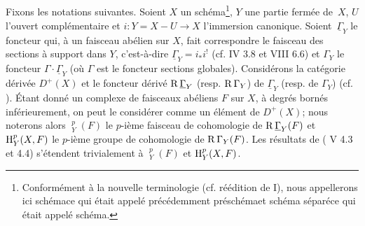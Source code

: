 \subsection{}\label{XIV.1.0}
Fixons les notations suivantes. Soient $X$ un sch\'ema\footnote{Conform\'ement \`a la nouvelle terminologie (cf. r\'e\'edition de \EGA I), nous appellerons ici \og sch\'ema\fg ce qui \'etait appel\'e pr\'ec\'edemment \og pr\'esch\'ema\fg et \og sch\'ema s\'epar\'e\fg ce qui \'etait appel\'e \og sch\'ema\fg.}, $Y$ une partie ferm\'ee de~$X$, $U$ l'ouvert compl\'ementaire et $i:Y=X-U\to X$ l'immersion canonique. Soient~$\underline{\Gamma}_Y$ le foncteur qui, \`a un faisceau ab\'elien sur $X$, fait correspondre le \og faisceau des sections \`a support dans $Y$\fg, c'est-\`a-dire $\underline{\Gamma}_Y=i_*i^!$ (cf.  IV 3.8 et VIII 6.6) et $\Gamma_Y$ le foncteur $\Gamma\cdot \underline{\Gamma}_Y$ (o\`u $\Gamma$ est le foncteur \og sections globales{\fg}). Consid\'erons la cat\'egorie d\'eriv\'ee $D^+(X)$ et le foncteur d\'eriv\'e $\operatorname{R}\underline{\Gamma}_Y$ (resp. $\operatorname{R}\Gamma_Y$) de $\underline{\Gamma}_Y$ (resp. de $\Gamma_Y$) (cf. \cite{XIV.3}). \'Etant donn\'e un complexe de faisceaux ab\'eliens $F$ sur $X$, \`a degr\'es born\'es inf\'erieurement, on peut le consid\'erer comme un \'el\'ement de $D^+(X)$; nous noterons alors ${\mathop{\underline{\mathrm{H}}}\nolimits}_Y^p(F)$ le $p$-i\`eme faisceau de cohomologie de $\operatorname{R}\underline{\Gamma}_Y(F)$ et $\operatorname{H}_Y^p(X, F)$ le $p$-i\`eme groupe de cohomologie de $\operatorname{R}\Gamma_Y(F)$. Les r\'esultats de ( V 4.3 et 4.4) s'\'etendent trivialement \`a ${\mathop{\underline{\mathrm{H}}}\nolimits}_Y^p(F)$ et $\operatorname{H}_Y^p(X, F)$.

